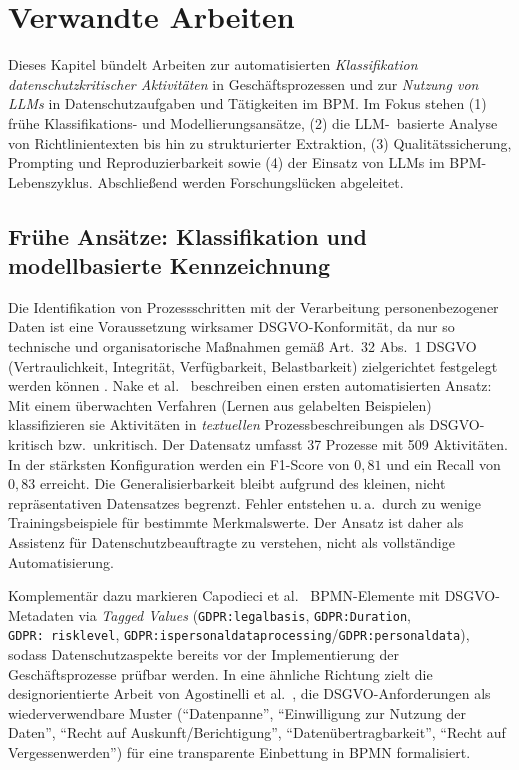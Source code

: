 \section{Verwandte Arbeiten}\label{sec:verwandte-arbeiten}

Dieses Kapitel bündelt Arbeiten zur automatisierten \emph{Klassifikation datenschutzkritischer Aktivitäten} in Geschäftsprozessen und zur \emph{Nutzung von \acp{LLM}} in Datenschutzaufgaben und Tätigkeiten im \ac{BPM}. Im Fokus stehen (1) frühe Klassifikations- und Modellierungsansätze, (2) die \ac{LLM}-\linebreak~basierte Analyse von Richtlinientexten bis hin zu strukturierter Extraktion, (3) Qualitätssicherung, Prompting und Reproduzierbarkeit sowie (4) der Einsatz von \acp{LLM} im \ac{BPM}-Lebenszyklus. Abschließend werden Forschungslücken abgeleitet.

\subsection*{Frühe Ansätze: Klassifikation und modellbasierte Kennzeichnung}

Die Identifikation von Prozessschritten mit der Verarbeitung personenbezogener Daten ist eine Voraussetzung wirksamer \ac{DSGVO}-Konformität, da nur so technische und organisatorische Maßnahmen gemäß Art.~32 Abs.~1 \ac{DSGVO} (Vertraulichkeit, Integrität, Verfügbarkeit, Belastbarkeit) zielgerichtet festgelegt werden können \cite{GDPR2016}. Nake et al.\ \cite{nake2023towards} beschreiben einen ersten automatisierten Ansatz: Mit einem überwachten Verfahren (Lernen aus gelabelten Beispielen) klassifizieren sie Aktivitäten in \emph{textuellen} Prozessbeschreibungen als \ac{DSGVO}-kritisch bzw.\ unkritisch. Der Datensatz umfasst 37 Prozesse mit 509 Aktivitäten. In der stärksten Konfiguration werden ein F1-Score von $0{,}81$ und ein Recall von $0{,}83$ erreicht. Die Generalisierbarkeit bleibt aufgrund des kleinen, nicht repräsentativen Datensatzes begrenzt. Fehler entstehen u.\,a.\ durch zu wenige Trainingsbeispiele für bestimmte Merkmalswerte. Der Ansatz ist daher als Assistenz für Datenschutzbeauftragte zu verstehen, nicht als vollständige Automatisierung.

Komplementär dazu markieren Capodieci et al.\ \cite{Capodieci2023BPMNEnabledDP} \ac{BPMN}-Elemente mit \ac{DSGVO}-Metadaten via \emph{Tagged Values} (\texttt{GDPR:legalbasis}, \texttt{GDPR:Duration}, \texttt{GDPR:\linebreak~risklevel}, \texttt{GDPR:ispersonaldataprocessing}/\texttt{GDPR:personaldata}), sodass Datenschutzaspekte bereits vor der Implementierung der Geschäftsprozesse prüfbar werden. In eine ähnliche Richtung zielt die designorientierte Arbeit von Agostinelli et al.\ \cite{agostinelli2019achievingGDPRComliance}, die \ac{DSGVO}-Anforderungen als wiederverwendbare Muster (\enquote{Datenpanne}, \enquote{Einwilligung zur Nutzung der Daten}, \enquote{Recht auf Auskunft/Berichtigung}, \enquote{Datenübertragbarkeit}, \enquote{Recht auf Vergessenwerden}) für eine transparente Einbettung in \ac{BPMN} formalisiert.

